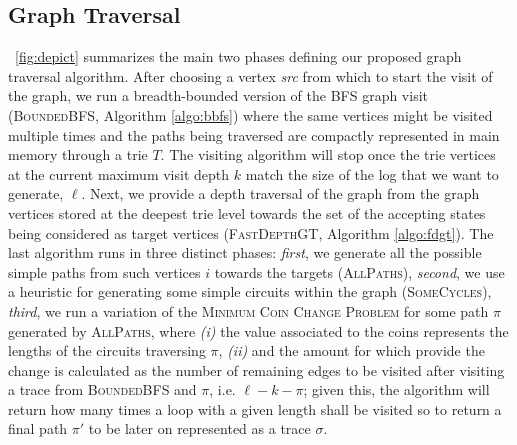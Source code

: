 \documentclass[sigconf]{acmart}
\begin{document}
\subsection{Graph Traversal}\label{sec:gtrav}
\figurename~\ref{fig:depict} summarizes the main two phases defining our proposed graph traversal algorithm. After choosing a vertex \textit{src} from which to start the visit of the graph, we run a breadth-bounded version of the BFS graph visit (\textsc{BoundedBFS}, Algorithm \ref{algo:bbfs}) where the same vertices might be visited multiple times and the paths being traversed are compactly represented in main memory through a trie $T$. The visiting algorithm will stop once the trie vertices at the current maximum visit depth $k$ match the size of the log that we want to generate, $\ell$.  Next, we provide a depth traversal of the graph from the graph vertices stored at the deepest trie level towards the set of the accepting states being considered as target vertices (\textsc{FastDepthGT}, Algorithm \ref{algo:fdgt}). The last algorithm runs in  three distinct phases: \textit{first}, we generate all the possible simple paths from such vertices $i$ towards the targets (\textsc{AllPaths}), \textit{second}, we use a heuristic for generating some simple circuits within the graph (\textsc{SomeCycles}), \textit{third}, we run a variation of the \textsc{Minimum Coin Change Problem} for some path $\pi$ generated by \textsc{AllPaths}, where \textit{(i)} the value associated to the coins represents the lengths of the circuits traversing $\pi$, \textit{(ii)} and the amount for which provide  the change is calculated as the number of remaining edges to be visited after visiting a trace from \textsc{BoundedBFS} and $\pi$, i.e. $\ell-k-\pi$; given this, the algorithm will return how many times a loop with a given length shall be visited so to return a final path $\pi'$ to be later on represented as a trace $\sigma$.
\end{document}
